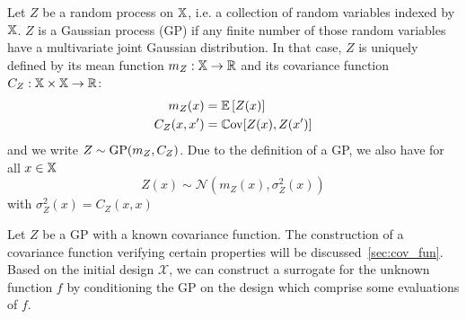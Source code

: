 \documentclass[../../Main_ManuscritThese.tex]{subfiles}
\begin{document}
\begin{definition}
  Let $Z$ be a random process on $\mathbb{X}$, i.e. a collection of random variables indexed by $\mathbb{X}$. $Z$ is a Gaussian process (GP) if any finite number of those random variables have a multivariate joint Gaussian distribution.
  In that case, $Z$ is uniquely defined by its mean function $m_Z:\mathbb{X} \rightarrow \mathbb{R}$ and its covariance function $C_Z:\mathbb{X} \times \mathbb{X} \rightarrow \mathbb{R}$:
  \begin{align}
    m_Z(x) &= \mathbb{E}\left[Z(x)\right] \\
    C_Z(x, x^{\prime}) &= \mathbb{C}\mathrm{ov}[Z(x), Z(x^{\prime})]
  \end{align}
  and we write $Z \sim \operatorname{\mathrm{GP}}(m_Z, C_Z)$.
  Due to the definition of a GP, we also have for all $x\in \mathbb{X}$
  \begin{equation}
    Z(x) \sim \mathcal{N}(m_Z(x), \sigma^2_Z(x)) 
  \end{equation}
  with $\sigma_Z^2(x) = C_Z(x, x)$
\end{definition}

Let $Z$ be a GP with a known covariance function. The construction of a covariance function verifying certain properties will be discussed~\cref{sec:cov_fun}.
Based on the initial design $\mathcal{X}$, we can construct a surrogate for the unknown function $f$ by conditioning the GP on the design which comprise some evaluations of $f$.   
\end{document}
